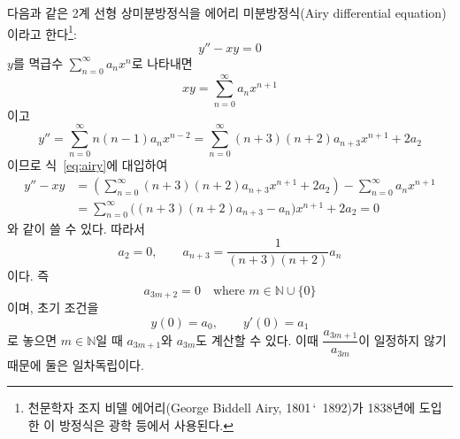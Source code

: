 \documentclass[../engineering_mathematics_lecture_note.tex]{subfiles}
\begin{document}
\begin{example}
    다음과 같은 2계 선형 상미분방정식을 에어리 미분방정식(Airy differential equation)이라고 한다\footnote{천문학자 조지 비델 에어리(George Biddell Airy, 1801\,\char`~1892)가 1838년에 도입한 이 방정식은 광학 등에서 사용된다.}:
    \begin{equation} \label{eq:airy}
        y'' - xy = 0
    \end{equation}
    $y$를 멱급수 $\sum_{n = 0}^\infty a_n x^n$로 나타내면
    \begin{equation*}
        xy = \sum^{\infty}_{n = 0} a_n x^{n + 1}
    \end{equation*}
    이고
    \begin{equation*}
        y'' = \sum^{\infty}_{n = 0} n(n - 1) a_n x^{n - 2} = \sum^{\infty}_{n = 0} (n + 3)(n + 2)a_{n + 3} x^{n + 1} + 2a_2
    \end{equation*}
    이므로 식~\ref{eq:airy}에 대입하여
    \begin{align*}
        y'' - xy &= \left(\sum^{\infty}_{n = 0} (n + 3) (n + 2) a_{n + 3} x^{n + 1} + 2a_2\right) - \sum^{\infty}_{n = 0} a_n x^{n + 1}\\
                 &= \sum^{\infty}_{n = 0} \bigl( (n + 3) (n + 2) a_{n + 3} - a_n \bigr) x^{n + 1} + 2a_2 = 0
    \end{align*}
    와 같이 쓸 수 있다.
    따라서
    \begin{equation*}
        a_2 = 0, \qquad a_{n + 3} = \frac{1}{(n + 3) (n + 2)} a_n
    \end{equation*}
    이다.
    즉
    \begin{equation*}
        a_{3m + 2} = 0 \quad \text{where } m \in \mathbb N \cup \{0\}
    \end{equation*}
    이며, 초기 조건을
    \begin{equation*}
        y(0) = a_0, \qquad y'(0) = a_1
    \end{equation*}
    로 놓으면 $m \in \mathbb N$일 때 $a_{3m + 1}$와 $a_{3m}$도 계산할 수 있다.
    이때 $\dfrac{a_{3m + 1}}{a_{3m}}$이 일정하지 않기 때문에 둘은 일차독립이다.
\end{example}
\end{document}

